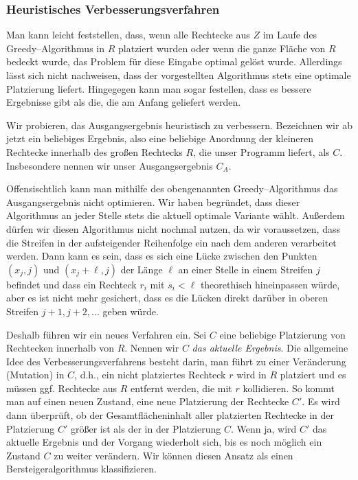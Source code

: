 \subsubsection{Heuristisches Verbesserungsverfahren}\label{sec:verbesserung}
Man kann leicht feststellen, dass, wenn alle Rechtecke aus $Z$ im Laufe des
Greedy--Algorithmus in $R$ platziert wurden oder wenn die ganze Fläche von $R$ bedeckt wurde, 
das Problem für diese Eingabe optimal gelöst wurde.
Allerdings lässt sich nicht nachweisen, dass der vorgestellten Algorithmus 
stets eine optimale Platzierung liefert.
Hingegegen kann man sogar festellen, dass es bessere Ergebnisse gibt als die,
die am Anfang geliefert werden. 


Wir probieren, das Ausgangsergebnis heuristisch zu verbessern.
Bezeichnen wir ab jetzt ein beliebiges Ergebnis, also eine beliebige Anordnung
der kleineren Rechtecke innerhalb des großen Rechtecks $R$, die unser Programm liefert, 
als $C$. Insbesondere nennen wir unser Ausgangsergebnis $C_A$.


Offensischtlich kann man mithilfe des obengenannten Greedy--Algorithmus 
das Ausgangsergebnis nicht optimieren. Wir haben begründet, dass dieser Algorithmus
an jeder Stelle stets die aktuell optimale Variante wählt. 
Außerdem dürfen wir diesen Algorithmus nicht nochmal nutzen,
da wir voraussetzen, dass die Streifen in der aufsteigender Reihenfolge ein nach dem anderen
verarbeitet werden. Dann kann es sein, dass es sich eine Lücke zwischen den Punkten $(x_j, j)$ und 
$(x_j + \ell, j)$ der Länge $\ell$ an einer Stelle in einem Streifen $j$ befindet
und dass ein Rechteck $r_i$ mit $s_i < \ell$ theorethisch hineinpassen würde, aber
es ist nicht mehr gesichert, dass es die Lücken direkt darüber in oberen Streifen $j+1, j+2, ...$
geben würde.


Deshalb führen wir ein neues Verfahren ein. 
Sei $C$ eine beliebige Platzierung von Rechtecken innerhalb von $R$.
Nennen wir $C$ \textit{das aktuelle Ergebnis}. 
Die allgemeine Idee des Verbesserungsverfahrens besteht darin,
man führt zu einer Veränderung (Mutation) in $C$, d.h., 
ein nicht platziertes Rechteck $r$ wird in $R$ platziert und es müssen ggf. 
Rechtecke aus $R$ entfernt werden, die mit $r$ kollidieren.
So kommt man auf einen neuen Zustand, eine neue Platzierung der Rechtecke $C'$.
Es wird dann überprüft, ob der Gesamtflächeninhalt aller platzierten Rechtecke in der Platzierung $C'$
größer ist als der in der Platzierung $C$.
Wenn ja, wird $C'$ das aktuelle Ergebnis und der Vorgang wiederholt sich,
bis es noch möglich ein Zustand $C$ zu weiter verändern.
Wir können diesen Ansatz als einen Bersteigeralgorithmus klassifizieren.


